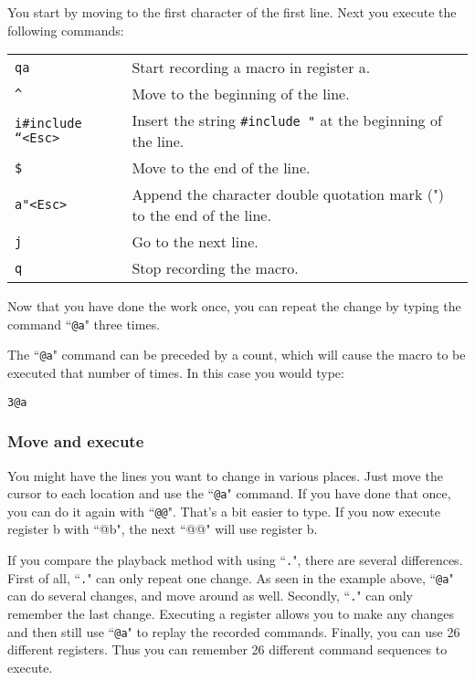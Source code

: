 You start by moving to the first character of the first line.
Next you execute the following commands:

\begin{center}\begin{tabular}{l l}
				\texttt{qa} & Start recording a macro in register a.\\
				\texttt{\^{}} & Move to the beginning of the line.\\
				\texttt{i\#include ``<Esc>} & Insert the string \texttt{\#include "} at the beginning of the line.\\
				\texttt{\$} & Move to the end of the line.\\
				\texttt{a"<Esc>} & Append the character double quotation mark (") to the end of the line.\\
				\texttt{j} & Go to the next line.\\
				\texttt{q} & Stop recording the macro.\\
\end{tabular}\end{center}

Now that you have done the work once, you can repeat the change by typing the command ``\texttt{@a}" three times.

The ``\texttt{@a}" command can be preceded by a count, which will cause the macro to be executed that number of times.
In this case you would type:

\begin{Verbatim}[samepage=true]
 3@a
\end{Verbatim}

\subsubsection{Move and execute}
You might have the lines you want to change in various places.
Just move the cursor to each location and use the ``\texttt{@a}" command.
If you have done that once, you can do it again with ``\texttt{@@}".
That's a bit easier to type.
If you now execute register b with ``@b", the next ``@@" will use register b.

If you compare the playback method with using ``\texttt{.}", there are several differences.
First of all, ``\texttt{.}" can only repeat one change.
As seen in the example above, ``\texttt{@a}" can do several changes, and move around as well.
Secondly, ``\texttt{.}" can only remember the last change.
Executing a register allows you to make any changes and then still use ``\texttt{@a}" to replay the recorded commands.
Finally, you can use 26 different registers.
Thus you can remember 26 different command sequences to execute.


